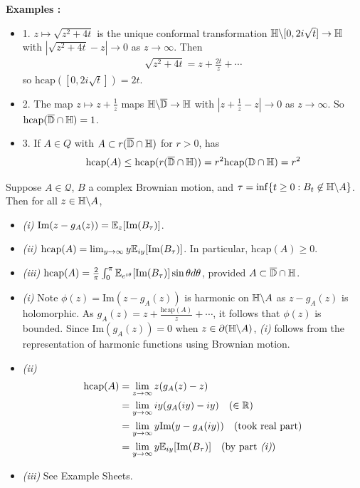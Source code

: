 \documentclass[12pt,a4paper]{article}
\newenvironment{proof}
{\begin{changemargin}{0.5cm}{0.5cm} 
	}%
	{\end{changemargin}
}
\renewenvironment{i}
{\begin{itemize} 
	}%
	{\end{itemize}
}
\newenvironment{p}
{\begin{proof} 
	}%
	{\end{proof}
}
\begin{document}
\textbf{Examples :}
\begin{i}
\item[1.] $z\mapsto \sqrt{z^2 + 4t}$ is the unique conformal transformation $\mathbb{H} \backslash [0, 2i\sqrt{t}] \rightarrow \mathbb{H}$ with $|\sqrt{z^2 + 4t} - z| \rightarrow 0$ as $z\rightarrow \infty$. Then
\begin{align*}
\sqrt{z^2 + 4t} = z+ \frac{2t}{z} + \cdots
\end{align*}
so $\text{hcap}([0, 2i\sqrt{t}]) =2t$.
\item[2.] The map $z\mapsto z+ \frac{1}{z}$ maps $\mathbb{H} \backslash \overline{\mathbb{D}} \rightarrow \mathbb{H}$ with $|z+ \frac{1}{z}-z| \rightarrow 0$ as $z\rightarrow \infty$. So $\text{hcap}(\overline{\mathbb{D}} \cap \mathbb{H}) =1$.
\item[3.] If $A\in Q$ with $A\subset r(\overline{\mathbb{D}}\cap \mathbb{H})$ for $r>0$, has
\begin{align*}
\text{hcap}(A) \leq \text{hcap}(r(\overline{\mathbb{D}}\cap \mathbb{H})) = r^2 \text{hcap}(\mathbb{D} \cap \mathbb{H}) = r^2
\end{align*}
\end{i}
\s

 Suppose $A\in \mathscr{Q}$, $B$ a complex Brownian motion, and $\tau = \inf \{t\geq 0 : B_t \not\in \mathbb{H} \backslash A\}$. Then for all $z\in \mathbb{H} \backslash A$,
\begin{i}
\item[\textit{(i)}] $\text{Im} (z- g_A(z)) = \mathbb{E}_z [\text{Im}(B_{\tau})]$.
\item[\textit{(ii)}] $\text{hcap}(A) = \lim_{y\rightarrow \infty} y \mathbb{E}_{iy} [\text{Im}(B_{\tau})]$. In particular, $\text{hcap}(A) \geq 0$.
\item[\textit{(iii)}] $\text{hcap}(A) = \frac{2}{\pi} \int_{0}^{\pi} \mathbb{E}_{e^{i\theta}} [\text{Im}(B_{\tau})] \sin \theta d\theta$, provided $A\subset \overline{\mathbb{D}}\cap \mathbb{H}$.
\end{i}
\begin{p}
\pf
\begin{i}
\item[\textit{(i)}] Note $\phi(z) = \text{Im}(z-g_A(z))$ is harmonic on $\mathbb{H} \backslash A$ as $z- g_A(z)$ is holomorphic. As $g_A(z) = z+ \frac{\text{hcap}(A)}{z} +\cdots$, it follows that $\phi(z)$ is bounded. Since $\text{Im}(g_A(z))=0$ when $z\in \partial (\mathbb{H} \backslash A)$, \textit{(i)} follows from the representation of harmonic functions using Brownian motion.
\item[\textit{(ii)}] 
\begin{align*}
\text{hcap}(A) &= \lim_{z\rightarrow \infty} z(g_A(z)-z) \\
&=\lim_{y\rightarrow \infty} iy (g_A(iy)-iy) \quad (\in \mathbb{R})\\
&= \lim_{y\rightarrow \infty} y \text{Im}(y - g_A(iy)) \quad (\text{took real part})\\
&=\lim_{y\rightarrow \infty} y\mathbb{E}_{iy}  [\text{Im}(B_{\tau})] \quad (\text{by part } \textit{(i)})
\end{align*}
\item[\textit{(iii)}] See Example Sheets.
\end{i}
\end{p}
\s
\end{document}
